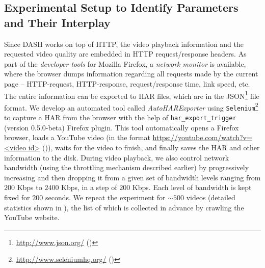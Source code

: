 \subsection{Experimental Setup to Identify Parameters and Their Interplay} 
Since \ac{DASH} works on top of \ac{HTTP}, the video playback information and the requested video quality are embedded in HTTP request/response headers.
As part of the {\em developer tools} for Mozilla Firefox, a {\em network monitor} is available, where the browser dumps information regarding all requests made by the current page -- \ac{HTTP}-request, \ac{HTTP}-response, request/response time, link speed, etc.
The entire information can be exported to \ac{HAR} files, which are in the \ac{JSON}\footnote{\url{http://www.json.org/} (\lastaccessedtoday)} file format.
We develop an automated tool called {\em AutoHARExporter} using \texttt{Selenium}\footnote{\url{http://www.seleniumhq.org/} (\lastaccessedtoday)} to capture a \ac{HAR} from the browser with the help of \texttt{har\_export\_trigger} (version 0.5.0-beta) Firefox plugin.
This tool automatically opens a Firefox browser, loads a YouTube video (in the format { \url{https://youtube.com/watch?v=<video id>} (\lastaccessedtoday)}), waits for the video to finish, and finally saves the \ac{HAR} and other information to the disk.
During video playback, we also control network bandwidth (using the throttling mechanism described earlier) by progressively increasing and then dropping it from a given set of bandwidth levels ranging from $200$ Kbps to $2400$ Kbps, in a step of $200$ Kbps.
Each level of bandwidth is kept fixed for $200$ seconds. 
We repeat the experiment for $\sim500$ videos (detailed statistics shown in \tbl{\ref{table:chap03s1:statvid}}), the list of which is collected in advance by crawling the YouTube website.

